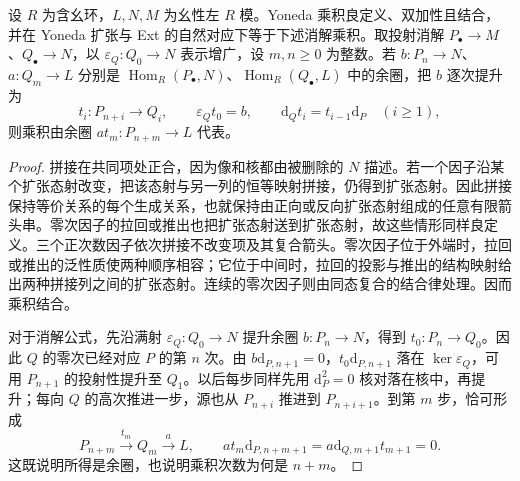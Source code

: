 \begin{proposition}\label{b4:prop:yoneda-resolution-product}
	设 \(R\) 为含幺环，\(L,N,M\) 为幺性左 \(R\) 模。Yoneda 乘积良定义、双加性且结合，并在 Yoneda 扩张与 Ext 的自然对应下等于下述消解乘积。取投射消解 \(P_\bullet\to M\)、\(Q_\bullet\to N\)，以 \(\varepsilon_Q:Q_0\to N\) 表示增广，设 \(m,n\ge0\) 为整数。若 \(b:P_n\to N\)、\(a:Q_m\to L\) 分别是 \(\operatorname{Hom}_R(P_\bullet,N)\)、\(\operatorname{Hom}_R(Q_\bullet,L)\) 中的余圈，把 \(b\) 逐次提升为
	\[
		t_i:P_{n+i}\longrightarrow Q_i,\qquad \varepsilon_Qt_0=b,\qquad \mathrm{d}_Qt_i=t_{i-1}\mathrm{d}_P\quad(i\ge1),
	\]
	则乘积由余圈 \(a t_m:P_{n+m}\to L\) 代表。
\end{proposition}
\begin{proof}
	拼接在共同项处正合，因为像和核都由被删除的 \(N\) 描述。若一个因子沿某个扩张态射改变，把该态射与另一列的恒等映射拼接，仍得到扩张态射。因此拼接保持等价关系的每个生成关系，也就保持由正向或反向扩张态射组成的任意有限箭头串。零次因子的拉回或推出也把扩张态射送到扩张态射，故这些情形同样良定义。三个正次数因子依次拼接不改变项及其复合箭头。零次因子位于外端时，拉回或推出的泛性质使两种顺序相容；它位于中间时，拉回的投影与推出的结构映射给出两种拼接列之间的扩张态射。连续的零次因子则由同态复合的结合律处理。因而乘积结合。

	对于消解公式，先沿满射 \(\varepsilon_Q:Q_0\to N\) 提升余圈 \(b:P_n\to N\)，得到 \(t_0:P_n\to Q_0\)。因此 \(Q\) 的零次已经对应 \(P\) 的第 \(n\) 次。由 \(b\mathrm{d}_{P,n+1}=0\)，\(t_0\mathrm{d}_{P,n+1}\) 落在 \(\ker\varepsilon_Q\)，可用 \(P_{n+1}\) 的投射性提升至 \(Q_1\)。以后每步同样先用 \(\mathrm{d}_P^2=0\) 核对落在核中，再提升；每向 \(Q\) 的高次推进一步，源也从 \(P_{n+i}\) 推进到 \(P_{n+i+1}\)。到第 \(m\) 步，恰可形成
	\[
		P_{n+m}\xrightarrow{t_m}Q_m\xrightarrow{a}L, \qquad a t_m\mathrm{d}_{P,n+m+1} =a\mathrm{d}_{Q,m+1}t_{m+1}=0.
	\]
	这既说明所得是余圈，也说明乘积次数为何是 \(n+m\)。


\end{proof}
